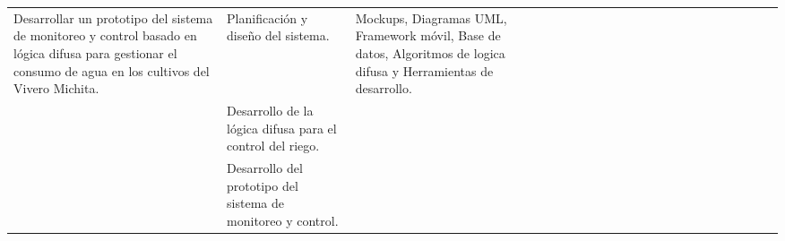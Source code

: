 \begin{landscape}
\begin{ThreePartTable}
\begin{longtable}{|p{}|p{5.5cm}|p{5.5cm}|l|l|l|l|l|l|l|l|l|l|l|l|l|l|l|l|l|l|l|}
      \hline
      \multirow{4}{0.28 \textwidth}{Desarrollar un prototipo del sistema de monitoreo y control basado en lógica difusa para gestionar el consumo de agua en los cultivos del Vivero Michita.} & Planificación y diseño del sistema.                                                        & Mockups, Diagramas UML, Framework móvil, Base de datos, Algoritmos de logica difusa y Herramientas de desarrollo. &                                       &                                       &                                       &                                       & \cellcolor{magenta!70} & \cellcolor{magenta!70} &                        &                        &                        &                        &                        &                        &                        &                        &                        \\
      \cline{2-2}\cline{4-21}
                                                                                                                                                                                               & Desarrollo de la lógica difusa para el control del riego.                                  &                                                                                                                   &                                       &                                       &                                       &                                       &                        &                        & \cellcolor{magenta!70} & \cellcolor{magenta!70} &                        &                        &                        &                        &                        &                        &                        \\
      \cline{2-2}\cline{4-21}
                                                                                                                                                                                               & Desarrollo del prototipo del sistema de monitoreo y control.                               &                                                                                                                   &                                       &                                       &                                       &                                       &                        &                        &                        &                        & \cellcolor{magenta!70} & \cellcolor{magenta!70} & \cellcolor{magenta!70} &                        &                        &                        &                        \\

\end{longtable}
\end{ThreePartTable}
\end{landscape}
